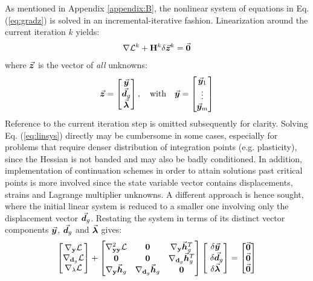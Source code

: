 As mentioned in Appendix \ref{appendix:B}, the nonlinear system of equations in 
Eq.
(\ref{eq:gradz}) is solved in an incremental-iterative fashion. Linearization 
around
the current iteration $k$ yields:
\begin{gather}
	\nabla\mathcal{L}^k + \mathbf{H}^k\delta\vec{\bm{z}}^k = \vec{\bm{0}}
	\label{eq:linsys}
\end{gather}
\noindent where $\vec{\bm{z}}$ is the vector of \emph{all} unknowns:
\begin{gather*}
	\vec{\bm{z}} = \begin{bmatrix}
		\vec{\bm{y}}\\
		\vec{\bm{d}}_g\\
		\vec{\bm{\lambda}}
	\end{bmatrix},\quad\text{with}\quad \vec{\bm{y}} = \begin{bmatrix}
		\vec{\bm{y}}_1\\
		\vdots\\
		\vec{\bm{y}}_m
	\end{bmatrix}
\end{gather*}
Reference to the current iteration step is omitted subsequently
for clarity.
Solving Eq. (\ref{eq:linsys}) directly may be cumbersome in
some cases, especially for problems that require denser distribution of
integration points (e.g. plasticity), since the Hessian is not banded and
may also be badly conditioned. In addition, implementation of
continuation schemes in order to attain solutions past critical points
is more involved since the state variable vector contains displacements, strains
and Lagrange multiplier unknowns. A different approach is hence sought,
where the initial linear system is reduced to a smaller one involving only the
displacement vector $\vec{\bm{d}}_g$. Restating the system in terms of its
distinct vector components $\vec{\bm{y}}$, $\vec{\bm{d}}_g$ and $\vec{\bm{\lambda}}$
gives:
\begin{gather}
	\begin{bmatrix}
		\nabla_{\mathbf{y}}\mathcal{L}\\
		\nabla_{\mathbf{d}_g}\mathcal{L}\\
		\nabla_{\mathbf{\lambda}}\mathcal{L}
	\end{bmatrix} +
	\begin{bmatrix}
		\nabla^2_{\mathbf{yy}}\mathcal{L} & \mathbf{0} & 
		\nabla_{\mathbf{y}}\vec{\bm{h}}^T_g\\
		\mathbf{0} & \mathbf{0} & \nabla_{\mathbf{d}_g}\vec{\bm{h}}^T_g\\
		\nabla_{\mathbf{y}}\vec{\bm{h}}_g & \nabla_{\mathbf{d}_g}\vec{\bm{h}}_g & 
		\mathbf{0}\\
	\end{bmatrix}\begin{bmatrix}
		\delta\vec{\bm{y}} \\ {\ }\delta\vec{\bm{d}}_g \\ \delta\vec{\bm{\lambda}}
	\end{bmatrix}
	= \begin{bmatrix}
		\vec{\bm{0}}\\ \vec{\bm{0}}\\ \vec{\bm{0}}
	\end{bmatrix}
	\label{eq:linon}
\end{gather}

